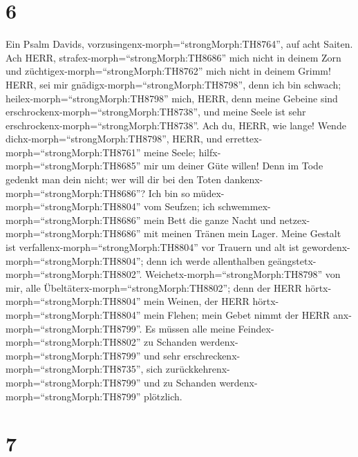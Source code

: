 \hypertarget{section-5}{%
\section{6}\label{section-5}}

 Ein Psalm Davids,
vorzusingenx-morph=``strongMorph:TH8764'', auf acht Saiten. Ach HERR,
strafex-morph=``strongMorph:TH8686'' mich nicht in deinem Zorn und
züchtigex-morph=``strongMorph:TH8762'' mich nicht in deinem Grimm!
 HERR, sei mir gnädigx-morph=``strongMorph:TH8798'', denn
ich bin schwach; heilex-morph=``strongMorph:TH8798'' mich, HERR, denn
meine Gebeine sind erschrockenx-morph=``strongMorph:TH8738'',
 und meine Seele ist sehr
erschrockenx-morph=``strongMorph:TH8738''. Ach du, HERR, wie lange!
 Wende dichx-morph=``strongMorph:TH8798'', HERR, und
errettex-morph=``strongMorph:TH8761'' meine Seele;
hilfx-morph=``strongMorph:TH8685'' mir um deiner Güte willen!
 Denn im Tode gedenkt man dein nicht; wer will dir bei den
Toten dankenx-morph=``strongMorph:TH8686''?  Ich bin so
müdex-morph=``strongMorph:TH8804'' vom Seufzen; ich
schwemmex-morph=``strongMorph:TH8686'' mein Bett die ganze Nacht und
netzex-morph=``strongMorph:TH8686'' mit meinen Tränen mein Lager.
 Meine Gestalt ist verfallenx-morph=``strongMorph:TH8804''
vor Trauern und alt ist gewordenx-morph=``strongMorph:TH8804''; denn ich
werde allenthalben geängstetx-morph=``strongMorph:TH8802''. 
Weichetx-morph=``strongMorph:TH8798'' von mir, alle
Übeltäterx-morph=``strongMorph:TH8802''; denn der HERR
hörtx-morph=``strongMorph:TH8804'' mein Weinen,  der HERR
hörtx-morph=``strongMorph:TH8804'' mein Flehen; mein Gebet nimmt der
HERR anx-morph=``strongMorph:TH8799''.  Es müssen alle
meine Feindex-morph=``strongMorph:TH8802'' zu Schanden
werdenx-morph=``strongMorph:TH8799'' und sehr
erschreckenx-morph=``strongMorph:TH8735'', sich
zurückkehrenx-morph=``strongMorph:TH8799'' und zu Schanden
werdenx-morph=``strongMorph:TH8799'' plötzlich.

\hypertarget{section-6}{%
\section{7}\label{section-6}}

